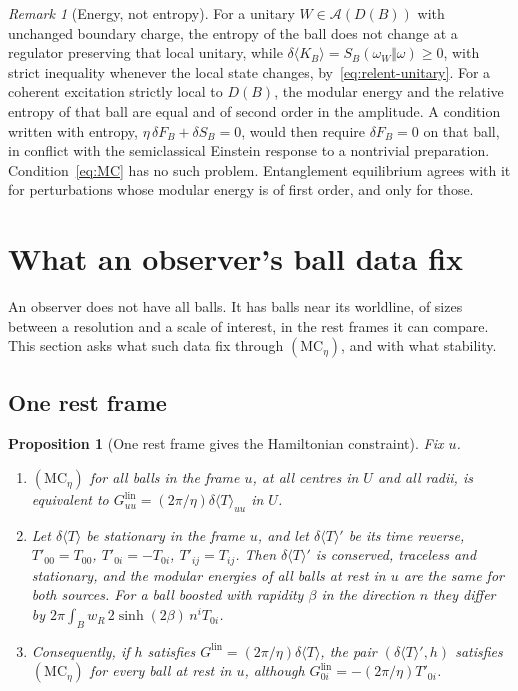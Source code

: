 \documentclass[12pt]{article}
\newtheorem{proposition}[theorem]{Proposition}
\theoremstyle{definition}
\theoremstyle{remark}
\newtheorem{remark}[theorem]{Remark}
\newcommand{\Glin}{G^{\mathrm{lin}}}
\newcommand{\dT}{\delta\langle T\rangle}
\newcommand{\ev}[1]{\langle #1\rangle}
\begin{document}
\begin{remark}[Energy, not entropy]\label{rem:energy}
For a unitary \(W\in\mathcal A(D(B))\) with unchanged boundary charge,
the entropy of the ball does not change at a
regulator preserving that local unitary, while
\(\delta\ev{K_B}=S_B(\omega_W\Vert\omega)\ge0\),
with strict inequality whenever the local state changes,
by~\eqref{eq:relent-unitary}. For a coherent excitation strictly local to \(D(B)\), the
modular energy and the relative entropy of that ball are equal and of second order in
the amplitude. A condition written with entropy,
\(\eta\,\delta F_B+\delta S_B=0\), would then require \(\delta F_B=0\) on that ball,
in conflict with the semiclassical Einstein response to a nontrivial preparation.
Condition~\eqref{eq:MC} has no such problem. Entanglement equilibrium agrees with it for
perturbations whose modular energy is of first order, and only for those.
\end{remark}

\section{What an observer's ball data fix}\label{sec:access}

An observer does not have all balls. It has balls near its worldline, of sizes between a
resolution and a scale of interest, in the rest frames it can compare. This section asks
what such data fix through \((\mathrm{MC}_\eta)\), and with what stability.

\subsection{One rest frame}\label{subsec:singleframe}

\begin{proposition}[One rest frame gives the Hamiltonian constraint]\label{prop:singleframe}
Fix \(u\).
\begin{enumerate}[label=(\alph*),leftmargin=2em,itemsep=1pt]
\item \((\mathrm{MC}_\eta)\) for all balls in the frame \(u\), at all centres in \(U\) and all
radii, is equivalent to \(\Glin_{uu}=(2\pi/\eta)\dT_{uu}\) in \(U\).
\item Let \(\dT\) be stationary in the frame \(u\), and let \(\dT'\) be its time reverse,
\(T'_{00}=T_{00}\), \(T'_{0i}=-T_{0i}\), \(T'_{ij}=T_{ij}\). Then \(\dT'\) is conserved,
traceless and stationary, and the modular energies of all balls at rest in \(u\) are the
same for both sources. For a ball boosted with rapidity \(\beta\) in the direction \(n\)
they differ by \(2\pi\int_Bw_R\,2\sinh(2\beta)\,n^iT_{0i}\).
\item Consequently, if \(h\) satisfies \(\Glin=(2\pi/\eta)\dT\), the pair \((\dT',h)\)
satisfies \((\mathrm{MC}_\eta)\) for every ball at rest in \(u\), although
\(\Glin_{0i}=-(2\pi/\eta)T'_{0i}\).
\end{enumerate}
\end{proposition}
\end{document}
